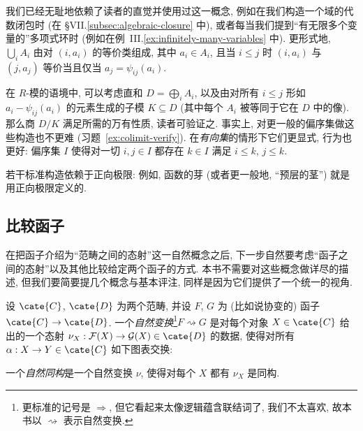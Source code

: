 我们已经无耻地依赖了读者的直觉并使用过这一概念, 例如在我们构造一个域的代数闭包时 (在 §VII.\ref{subsec:algebraic-closure} 中), 或者每当我们提到``有无限多个变量的''多项式环时 (例如在例~III.\ref{ex:infinitely-many-variables} 中). 更形式地, $\bigcup_i A_i$ 由对 $(i,a_i)$ 的等价类组成, 其中 $a_i\in A_i$, 且当 $i\leq j$ 时 $(i,a_i)$ 与 $(j,a_j)$ 等价当且仅当 $a_j=\psi_{ij}(a_i)$.

在 $R$-模的语境中, 可以考虑直和 $D=\bigoplus_i A_i$, 以及由对所有 $i\leq j$ 形如 $a_i-\psi_{ij}(a_i)$ 的元素生成的子模 $K\subseteq D$ (其中每个 $A_i$ 被等同于它在 $D$ 中的像). 那么商 $D/K$ 满足所需的万有性质, 读者可验证之. 事实上, 对更一般的偏序集做这些构造也不更难 (习题~\ref{ex:colimit-verify}). 在\emph{有向集}的情形下它们更显式, 行为也更好: 偏序集 $I$ 使得对一切 $i,j\in I$ 都存在 $k\in I$ 满足 $i\leq k$, $j\leq k$.

若干标准构造依赖于正向极限: 例如, 函数的芽 (或者更一般地, ``预层的茎'') 就是用正向极限定义的.

\subsection{比较函子}
\label{subsec:comparing-functors}

在把函子介绍为``范畴之间的态射''这一自然概念之后, 下一步自然要考虑``函子之间的态射''以及其他比较给定两个函子的方式. 本书不需要对这些概念做详尽的描述, 但我们要简要提几个概念与基本评注, 同样是因为它们提供了一个统一的视角.

\begin{definition}\label{def:natural-transformation}
设 $\cate{C}$, $\cate{D}$ 为两个范畴, 并设 $F$, $G$ 为 (比如说协变的) 函子 $\cate{C}\to\cate{D}$. 一个\emph{自然变换}\footnote{更标准的记号是 $\Rightarrow$, 但它看起来太像逻辑蕴含联结词了, 我们不太喜欢, 故本书以 $\rightsquigarrow$ 表示自然变换.}$F\rightsquigarrow G$ 是对每个对象 $X\in\cate{C}$ 给出的一个态射 $\nu_X:\mathcal{F}(X)\to\mathcal{G}(X)\in\cate{D}$ 的数据, 使得对所有 $\alpha:X\to Y\in\cate{C}$ 如下图表交换:
\begin{center}
\end{center}
一个\emph{自然同构}是一个自然变换 $\nu$, 使得对每个 $X$ 都有 $\nu_X$ 是同构.
\end{definition}

